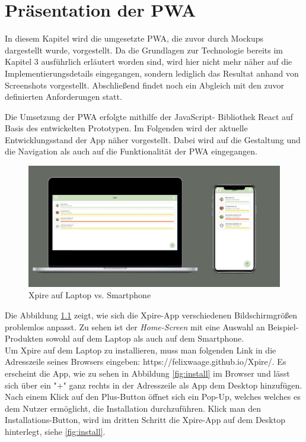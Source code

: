 \chapter{Präsentation der PWA}
In diesem Kapitel wird die umgesetzte PWA, die zuvor durch Mockups dargestellt wurde, vorgestellt. Da die Grundlagen zur Technologie bereits im Kapitel 3 ausführlich erläutert worden sind, wird hier nicht mehr näher auf die Implementierungsdetails eingegangen,
sondern lediglich das Resultat anhand von Screenshots vorgestellt. Abschließend findet noch ein Abgleich mit den zuvor definierten Anforderungen statt.

Die Umsetzung der PWA erfolgte mithilfe der JavaScript-
Bibliothek React auf Basis des entwickelten Prototypen. Im Folgenden wird der aktuelle Entwicklungsstand
der App näher vorgestellt. Dabei wird auf die Gestaltung
und die Navigation als auch auf die Funktionalität der PWA eingegangen.

\begin{figure}[h!]
	\centering
	\includegraphics[width=1.0\textwidth]{img/app.pdf}
	\caption{Xpire auf Laptop vs. Smartphone}
	\label{fig:app}
\end{figure}


Die Abbildung \ref{fig:app} zeigt, wie sich die Xpire-App verschiedenen Bildschirmgrößen problemlos anpasst. Zu sehen ist der \textit{Home-Screen} mit eine Auswahl an Beispiel-Produkten sowohl auf dem Laptop als auch auf dem Smartphone.\\
Um Xpire auf dem Laptop zu installieren, muss man folgenden Link in die Adresszeile seines Browsers eingeben: https://felixwaage.github.io/Xpire/. Es erscheint die App,  wie zu sehen in Abbildung \ref{fig:install} im Browser und lässt sich über ein "+" ganz rechts in der Adresszeile als App dem Desktop hinzufügen. Nach einem Klick auf den Plus-Button öffnet sich ein Pop-Up, welches welches es dem Nutzer ermöglicht, die Installation durchzuführen. Klick man den Installations-Button, wird im dritten Schritt die Xpire-App auf dem Desktop hinterlegt, siehe \ref{fig:install}.

